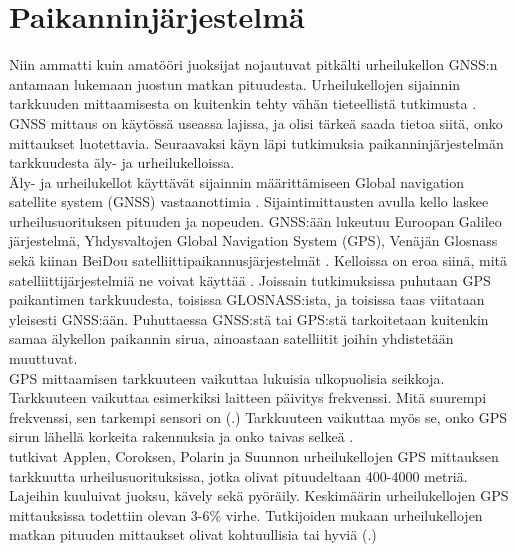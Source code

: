 \documentclass[utf8,bachelor,finnish]{bachelor}
\begin{document}
         
  \section{Paikanninjärjestelmä}
  Niin ammatti kuin amatööri juoksijat nojautuvat pitkälti urheilukellon GNSS:n antamaan lukemaan juostun matkan pituudesta.
   Urheilukellojen sijainnin tarkkuuden mittaamisesta on kuitenkin tehty vähän tieteellistä tutkimusta \parencite{gilgen-ammann_accuracy_2020}.
    GNSS mittaus on käytössä useassa lajissa, ja olisi tärkeä saada tietoa siitä, onko mittaukset luotettavia. Seuraavaksi käyn läpi tutkimuksia
     paikanninjärjestelmän tarkkuudesta äly- ja urheilukelloissa.\\

  Äly- ja urheilukellot käyttävät sijainnin määrittämiseen Global navigation satellite system (GNSS) vastaanottimia \parencite{gilgen-ammann_accuracy_2020}. 
  Sijaintimittausten avulla kello laskee urheilusuorituksen pituuden ja nopeuden. GNSS:ään lukeutuu Euroopan Galileo järjestelmä, Yhdysvaltojen Global Navigation System (GPS),
   Venäjän Glosnass sekä kiinan BeiDou satelliittipaikannusjärjestelmät \parencite{hofmann2007gnss}.
    Kelloissa on eroa siinä, mitä satelliittijärjestelmiä ne voivat käyttää \parencite{ammann_accuracy_2016}.
     Joissain tutkimuksissa puhutaan GPS paikantimen tarkkuudesta, toisissa GLOSNASS:ista, ja toisissa taas viitataan yleisesti GNSS:ään. Puhuttaessa GNSS:stä tai GPS:stä
      tarkoitetaan kuitenkin samaa älykellon paikannin sirua, ainoastaan satelliitit joihin yhdistetään muuttuvat.\\

  GPS mittaamisen tarkkuuteen vaikuttaa lukuisia ulkopuolisia seikkoja. Tarkkuuteen vaikuttaa esimerkiksi laitteen päivitys frekvenssi.
   Mitä suurempi frekvenssi, sen tarkempi sensori on (\cite{cummins_global_2013}.) Tarkkuuteen vaikuttaa myös
    se, onko GPS sirun lähellä korkeita rakennuksia ja onko taivas selkeä \parencite{baranski_enhancing_2012}. \\

  \textcite{gilgen-ammann_accuracy_2020} tutkivat Applen, Coroksen, Polarin ja Suunnon urheilukellojen GPS mittauksen tarkkuutta urheilusuorituksissa, jotka olivat
    pituudeltaan 400-4000 metriä. Lajeihin kuuluivat juoksu, kävely sekä pyöräily. Keskimäärin urheilukellojen GPS mittauksissa todettiin olevan 3-6\% virhe.
    Tutkijoiden mukaan urheilukellojen matkan pituuden mittaukset olivat kohtuullisia tai hyviä (\cite{gilgen-ammann_accuracy_2020}.)\\
\end{document}
